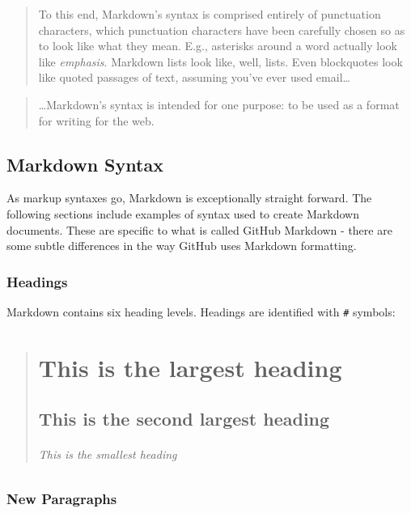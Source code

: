 \documentclass[]{book}
\let\oldsubparagraph\subparagraph
\renewcommand{\subparagraph}[1]{\oldsubparagraph{#1}\mbox{}}
\theoremstyle{definition}
\theoremstyle{definition}
\theoremstyle{remark}
\begin{document}
\begin{quote}
To this end, Markdown's syntax is comprised entirely of punctuation
characters, which punctuation characters have been carefully chosen so
as to look like what they mean. E.g., asterisks around a word actually
look like \emph{emphasis}. Markdown lists look like, well, lists. Even
blockquotes look like quoted passages of text, assuming you've ever used
email\ldots{}
\end{quote}

\begin{quote}
\ldots{}Markdown's syntax is intended for one purpose: to be used as a
format for writing for the web.
\end{quote}

\section{Markdown Syntax}\label{markdown-syntax}

As markup syntaxes go, Markdown is exceptionally straight forward. The
following sections include examples of syntax used to create Markdown
documents. These are specific to what is called GitHub Markdown - there
are some subtle differences in the way GitHub uses Markdown formatting.

\subsection{Headings}\label{headings}

Markdown contains six heading levels. Headings are identified with
\texttt{\#} symbols:

\begin{quote}
\chapter{This is the largest heading}\label{this-is-the-largest-heading}

\section{This is the second largest
heading}\label{this-is-the-second-largest-heading}

\mbox{}%
\subparagraph{This is the smallest
heading}\label{this-is-the-smallest-heading}
\end{quote}

\subsection{New Paragraphs}\label{new-paragraphs}
\end{document}
